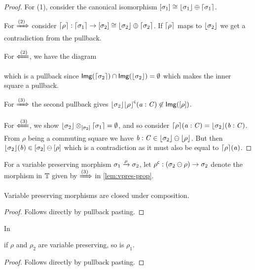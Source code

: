 \begin{proof}\nl
    For (1), consider the canonical isomorphism $[\sigma_1] \cong \lfloor\sigma_1\rfloor \oplus \lceil\sigma_1\rceil$.

    For $\xRightarrow{(2)}$ consider $\lceil\rho\rceil : \lceil\sigma_1\rceil \to [\sigma_2] \cong \lfloor\sigma_2\rfloor \oplus \lceil\sigma_2\rceil$.
    If $\lceil\rho\rceil$ maps to $\lfloor\sigma_2\rfloor$ we get a contradiction from the pullback.

    For $\xLeftarrow{(2)}$, we have the diagram 
    which is a pullback since $\mathsf{Img}(\lceil\sigma_2\rceil) \cap \mathsf{Img}(\lfloor\sigma_2\rfloor) = \emptyset$ which makes the inner square a pullback.

    For $\xRightarrow{(3)}$ the second pullback gives $\lfloor\sigma_2\rfloor{\lfloor\rho\rfloor}^\mathsf{c}(\mathit{a} : \mathit{C}) \not\in \mathsf{Img}([\rho])$.

    For $\xLeftarrow{(3)}$, we show $\lfloor\sigma_2\rfloor \otimes_{[\sigma_2]} \lceil\sigma_1\rceil = \emptyset$, and so consider $\lceil\rho\rceil(\mathit{a} : \mathit{C}) = \lfloor\sigma_2\rfloor(\mathit{b} : \mathit{C})$.
    From $\rho$ being a commuting square we have $\mathit{b} : \mathit{C} \in \lfloor\sigma_2\rfloor \ominus \lfloor\rho\rfloor$. 
    But then $\lfloor\sigma_2\rfloor(\mathit{b}) \in [\sigma_2] \ominus [\rho]$ which is a contradiction as it must also be equal to $\lceil\rho\rceil(\mathit{a})$.
\end{proof}

\begin{notation}
    For a variable preserving morphism $\sigma_1 \xrightarrow\rho \sigma_2$, 
    let ${\rho}^\mathsf{c} : (\sigma_2 \ominus \rho) \to \sigma_2$ denote the morphism in $\mathbb{T}$ given by $\xRightarrow{(3)}$ in \cref{lem:vpres-prop}.
\end{notation}

\begin{lemma}\label{lem:comp-vpres}
    Variable preserving morphisms are closed under composition.
\end{lemma}
\begin{proof}
    Follows directly by pullback pasting.
\end{proof}

\begin{lemma}\label{lem:vpres-cancl}
    In 
    if $\rho$ and $\rho_2$ are variable preserving, so is $\rho_1$.
\end{lemma}
\begin{proof}
    Follows directly by pullback pasting.
\end{proof}

